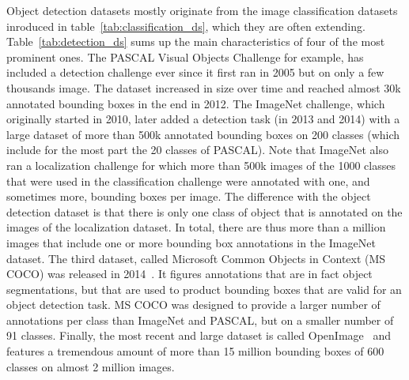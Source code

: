 Object detection datasets mostly originate from the image classification datasets
inroduced in table~\ref{tab:classification_ds}, which they are often extending.
Table~\ref{tab:detection_ds} sums up the main characteristics
of four of the most prominent ones.
The PASCAL Visual Objects Challenge \cite{Everingham10} for example,
has included a detection challenge ever
since it first ran in 2005 but on only a few thousands image.
The dataset increased in size over time and reached
almost 30k annotated bounding boxes in the end in 2012.
The ImageNet challenge, which originally started in 2010,
later added a detection task (in 2013 and 2014)
with a large dataset of more than 500k annotated bounding boxes
on 200 classes (which include for the most part the 20 classes of PASCAL).
Note that ImageNet also ran a localization challenge for which
more than 500k images of the 1000 classes that were used in
the classification challenge were annotated with one,
and sometimes more, bounding boxes per image.
The difference with the object detection dataset is that
there is only one class of object that is annotated
on the images of the localization dataset.
In total, there are thus more than a million images
that include one or more bounding box annotations in the ImageNet dataset.
The third dataset, called Microsoft Common Objects in Context (MS COCO)
was released in 2014~\cite{lin2014microsoft}.
It figures annotations that are in fact object segmentations,
but that are used to product bounding boxes that are valid for an object detection task.
MS COCO was designed to provide a larger number of annotations
per class than ImageNet and PASCAL, but on a smaller number of 91 classes.
Finally, the most recent and large dataset is called
OpenImage~\cite{OpenImages, OpenImages2} and features a tremendous amount
of more than 15 million bounding boxes of 600 classes on almost 2 million images.


